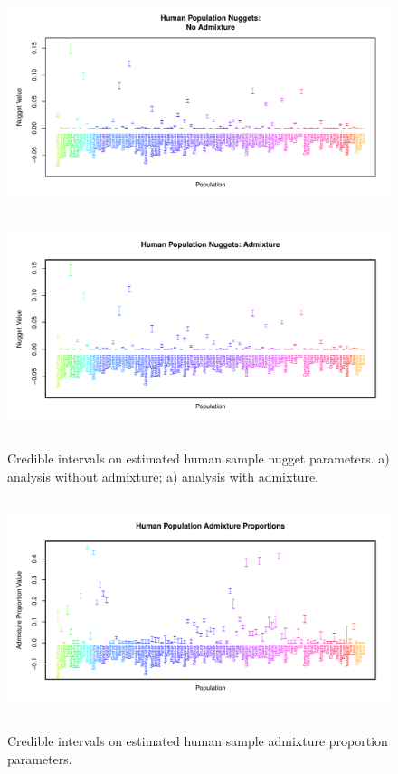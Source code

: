 \documentclass[12pt]{article}
\begin{document}
\begin{figure}
\centering
	\subcaptionbox{\label{globe_noad_nugg}}
		{\includegraphics[width=5in,height=2.5in]{figs/globetrotter/globe_NoAd_nugget.pdf}}
	\subcaptionbox{\label{globe_ad_nugg}}
		{\includegraphics[width=5in,height=2.5in]{figs/globetrotter/globe_Ad_nugget.pdf}}
	\caption{Credible intervals on estimated human sample nugget parameters. a) analysis without admixture; a) analysis with admixture.}
	\label{sfig:globe_nuggs}
\end{figure}

\clearpage

\begin{figure}
\centering
	{\includegraphics[width=5in,height=2.5in]{figs/globetrotter/globe_adprop.pdf}}
	\caption{Credible intervals on estimated human sample admixture proportion parameters.}\label{sfig:globe_adprops}
\end{figure}
\end{document}
